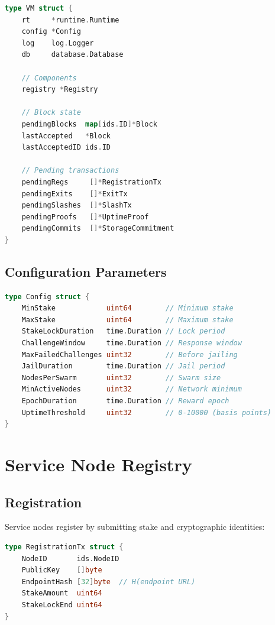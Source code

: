 \documentclass[11pt,a4paper]{article}
\begin{document}
\begin{lstlisting}[language=Go,caption={ServiceNodeVM Structure}]
type VM struct {
    rt     *runtime.Runtime
    config *Config
    log    log.Logger
    db     database.Database

    // Components
    registry *Registry

    // Block state
    pendingBlocks  map[ids.ID]*Block
    lastAccepted   *Block
    lastAcceptedID ids.ID

    // Pending transactions
    pendingRegs     []*RegistrationTx
    pendingExits    []*ExitTx
    pendingSlashes  []*SlashTx
    pendingProofs   []*UptimeProof
    pendingCommits  []*StorageCommitment
}
\end{lstlisting}

\subsection{Configuration Parameters}

\begin{lstlisting}[language=Go,caption={ServiceNodeVM Configuration}]
type Config struct {
    MinStake            uint64        // Minimum stake
    MaxStake            uint64        // Maximum stake
    StakeLockDuration   time.Duration // Lock period
    ChallengeWindow     time.Duration // Response window
    MaxFailedChallenges uint32        // Before jailing
    JailDuration        time.Duration // Jail period
    NodesPerSwarm       uint32        // Swarm size
    MinActiveNodes      uint32        // Network minimum
    EpochDuration       time.Duration // Reward epoch
    UptimeThreshold     uint32        // 0-10000 (basis points)
}
\end{lstlisting}

\section{Service Node Registry}

\subsection{Registration}

Service nodes register by submitting stake and cryptographic identities:

\begin{lstlisting}[language=Go,caption={Registration Transaction}]
type RegistrationTx struct {
    NodeID       ids.NodeID
    PublicKey    []byte
    EndpointHash [32]byte  // H(endpoint URL)
    StakeAmount  uint64
    StakeLockEnd uint64
}
\end{lstlisting}
\end{document}
